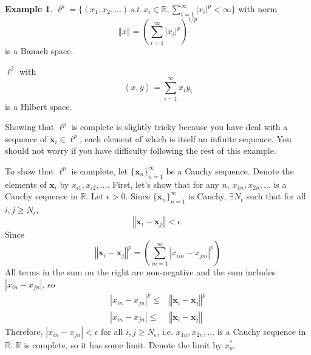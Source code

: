 \documentclass[12pt,reqno]{amsart}
\theoremstyle{definition}
\newtheorem{example}{Example}[section]
\def\R{\mathbb{R}}
\newcommand{\iprod}[2]{\left\langle {#1} , {#2} \right\rangle}
\newcommand{\norm}[1]{\left\Vert {#1} \right\Vert}
\newcommand{\abs}[1]{\left\vert {#1} \right\vert}
\newcommand{\seq}[1]{\{{#1}_n \}_{n=1}^\infty }
\begin{document}
\begin{example}
  $\ell^p = \{ (x_1, x_2, ...)\, s.t.\, x_i \in \R, \sum_{i=1}^\infty |x_i|^p <
  \infty \}$ with norm 
  \[ \norm{x} = \left( \sum_{i=1}^\infty |x_i|^p \right)^{1/p} \]
  is a Banach space. 
  
  $\ell^2$ with 
  \[ \iprod{x}{y} = \sum_{i=1}^\infty x_i y_i \]
  is a Hilbert space. 
  
  Showing that $\ell^p$ is complete is slightly tricky because you
  have deal with a sequence of $\mathbf{x}_i \in \ell^p$, each element
  of which is itself an infinite sequence. You should not worry if you
  have difficulty following the rest of this example.
  
  To show that $\ell^p$ is complete, let $\seq{\mathbf{x}}$ be a
  Cauchy sequence. Denote the elements of $\mathbf{x}_i$ by $x_{i1},
  x_{i2}, ... $. First, let's show that for any $n$, $x_{1n}, x_{2n},
  ... $ is a Cauchy sequence in $\R$. Let $\epsilon > 0$. Since
  $\seq{\mathbf{x}}$ is Cauchy, $\exists N_\epsilon$ such that for all $i,j
  \geq N_\epsilon$, 
  \[  \norm{\mathbf{x}_i - \mathbf{x}_j } < \epsilon. \]
  Since 
  \[ \norm{\mathbf{x}_i - \mathbf{x}_j }^p = \left( \sum_{m=1}^\infty
    \abs{x_{i m} - x_{j m}}^p \right) \]
  All terms in the sum on the right are non-negative and the sum
  includes $\abs{x_{i n} - x_{jn}}$, so 
  \begin{align*} \abs{x_{i n} - x_{j n} }^p \leq & \norm{\mathbf{x}_i -
      \mathbf{x}_j }^p \\
    \abs{x_{i n} - x_{j n} } \leq & 
    \norm{\mathbf{x}_i - \mathbf{x}_j }  
  \end{align*}
  Therefore, $\abs{x_{i n} - x_{j n}} < \epsilon$ for all $i,j \geq
  N_\epsilon$, i.e. $x_{1n}, x_{2n}, ...$ is a Cauchy sequence in
  $\R$. $\R$ is complete, so it has some limit. Denote the limit by
  $x^\ast_n$.  


\end{example}
\end{document}
